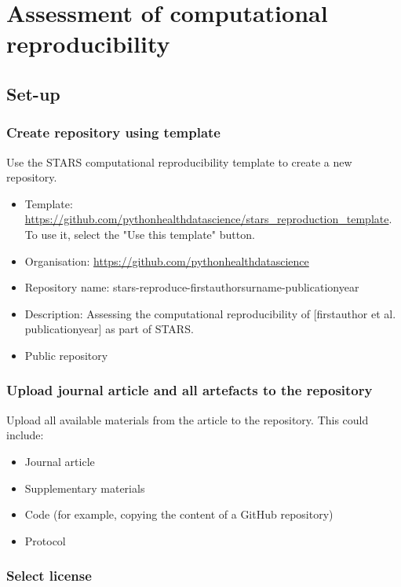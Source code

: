 \section{Assessment of computational reproducibility}

\subsection{Set-up}

\subsubsection{Create repository using template}
\timeno

Use the STARS computational reproducibility template to create a new repository.

\begin{itemize}
    \item Template: \url{https://github.com/pythonhealthdatascience/stars_reproduction_template}. To use it, select the "Use this template" button.
    \item Organisation: \url{https://github.com/pythonhealthdatascience}
    \item Repository name: stars-reproduce-firstauthorsurname-publicationyear
    \item Description: Assessing the computational reproducibility of [firstauthor et al. publicationyear] as part of STARS.
    \item Public repository
\end{itemize}

\subsubsection{Upload journal article and all artefacts to the repository}
\timeyes

Upload all available materials from the article to the repository. This could include:
\begin{itemize}
    \item Journal article
    \item Supplementary materials
    \item Code (for example, copying the content of a GitHub repository)
    \item Protocol
\end{itemize}

\subsubsection{Select license}
\timeyes

